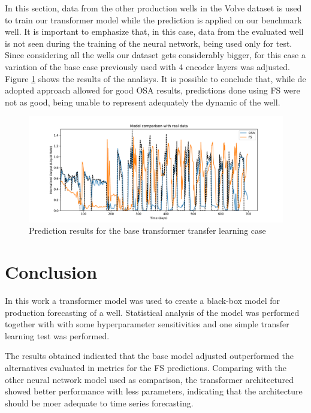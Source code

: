 \documentclass[conference]{IEEEtran}
\begin{document}
In this section, data from the other production wells in the Volve dataset is used to
train our transformer model while the prediction is applied on our benchmark well. 
It is important to emphasize that, in this case, data from the evaluated well is not
seen during the training of the neural network, being used only for test.
Since considering all the wells our dataset gets considerably bigger, for this case a variation
of the base case previously used with 4 encoder layers was adjusted. Figure \ref{fig:tl_prediction_results}
shows the results of the analisys. It is possible to conclude that, while de adopted approach
allowed for good OSA results, predictions done using FS were not as good, being unable to
represent adequately the dynamic of the well.

\begin{figure}[htbp]
    \centerline{\includegraphics[width=6.0in]{images/multi_best_model.pdf}}
    \caption{Prediction results for the base transformer transfer learning case}
    \label{fig:tl_prediction_results}
\end{figure}


\section{Conclusion}\label{sec:section_conclusion}

In this work a transformer model was used to create a black-box model for production
forecasting of a well. Statistical analysis of the model was performed together with
with some hyperparameter sensitivities and one simple transfer learning test was performed.

The results obtained indicated that the base model adjusted outperformed the alternatives 
evaluated in metrics for the FS predictions. Comparing with the other neural network model
used as comparison, the transformer architectured showed better performance with less parameters,
indicating that the architecture should be moer adequate to time series forecasting.
\end{document}
